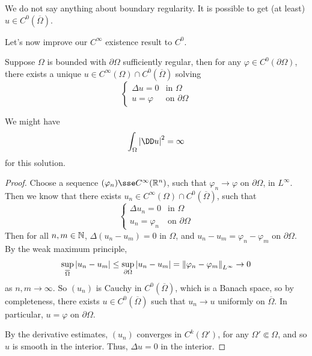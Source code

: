\documentclass{article}
\begin{document}
\begin{remark}
    We do not say anything about boundary regularity. It is possible to get (at least) \(u \in C^0(\overline\Omega)\).
\end{remark}

Let's now improve our \(C^\infty\) existence result to \(C^0\).

\begin{theorem}
     Suppose \(\Omega\) is bounded with \(\partial\Omega\) sufficiently regular, then for any \(\varphi \in C^0(\partial\Omega)\), there exists a unique \(u \in C^\infty(\Omega) \cap C^0(\overline\Omega)\) solving
    \[\begin{cases}
        \Delta u = 0 &\text{in }\Omega \\
        u = \varphi&\text{on }\partial\Omega
    \end{cases}\]
\end{theorem}

\begin{remark}
    We might have 
    \[\int_\Omega\abs{\DD u}^2 = \infty\]
    for this solution.
\end{remark}

\begin{proof}
    Choose a sequence \((\varphi_n) \sse C^\infty(\R^n)\), such that \(\varphi_n \to \varphi\) on \(\partial \Omega\), in \(L^\infty\). Then we know that there exists \(u_n \in C^\infty(\Omega) \cap C^0(\overline\Omega)\), such that
    \[\begin{cases}
        \Delta u_n = 0 &\text{in }\Omega \\
        u_n = \varphi_n &\text{on }\partial \Omega
    \end{cases}\]
    Then for all \(n, m \in \mathbb{N}\), \(\Delta(u_n - u_m) = 0\) in \(\Omega\), and \(u_n - u_m = \varphi_n - \varphi_m\) on \(\partial\Omega\). By the weak maximum principle,
    \[\sup_{\overline\Omega}\abs{u_n - u_m} \le \sup_{\partial\Omega}\abs{u_n - u_m} = \norm{\varphi_n - \varphi_m}_{L^\infty} \to 0\]
    as \(n, m \to \infty\). So \((u_n)\) is Cauchy in \(C^0(\overline\Omega)\), which is a Banach space, so by completeness, there exists \(u \in C^0(\overline\Omega)\) such that \(u_n \to u\) uniformly on \(\overline\Omega\). In particular, \(u = \varphi\) on \(\partial\Omega\).

    By the derivative estimates, \((u_n)\) converges in \(C^k(\Omega')\), for any \(\Omega' \Subset \Omega\), and so \(u\) is smooth in the interior. Thus, \(\Delta u = 0\) in the interior.
\end{proof}
\end{document}
